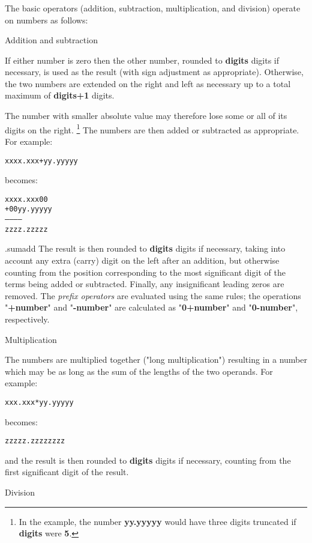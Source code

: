 \subsubsection{}\label{"id"}
 The basic operators (addition, subtraction, multiplication, and
division) operate on numbers as follows:
\begin{description}
\item{Addition and subtraction}

If either number is zero then the other number, rounded
to \textbf{digits} digits if necessary, is used as the result (with
sign adjustment as appropriate).
Otherwise, the two numbers are extended on the right and left as
necessary up to a total maximum of \textbf{digits+1} digits.
 
The number with smaller absolute value may therefore lose some or
all of its digits on the right.
\footnote{
In the example, the number \textbf{yy.yyyyy} would have three digits
truncated if \textbf{digits} were \textbf{5}.
}
The numbers are then added or subtracted as appropriate.  For example:
\begin{alltt}
xxxx.xxx + yy.yyyyy
\end{alltt}
becomes:
\begin{alltt}
  xxxx.xxx00
+ 00yy.yyyyy
------------
  zzzz.zzzzz
\end{alltt}
.sumadd
The result is then rounded to \textbf{digits} digits if necessary,
taking into account any extra (carry) digit on the left after an
addition, but otherwise counting from the position corresponding to the
most significant digit of the terms being added or subtracted.
Finally, any insignificant leading zeros are removed.
 The \emph{prefix operators} are evaluated using the same rules;
the operations "\textbf{+number}" and "\textbf{-number}"
are calculated as "\textbf{0+number}" and
"\textbf{0-number}", respectively.
\item{Multiplication}

The numbers are multiplied together ("long multiplication")
resulting in a number which may be as long as the sum of the lengths of
the two operands.  For example:
\begin{alltt}
xxx.xxx * yy.yyyyy
\end{alltt}
becomes:
\begin{alltt}
zzzzz.zzzzzzzz
\end{alltt}
and the result is then rounded to \textbf{digits} digits if
necessary, counting from the first significant digit of the result.
\item{Division}
\index{,}


\end{description}
